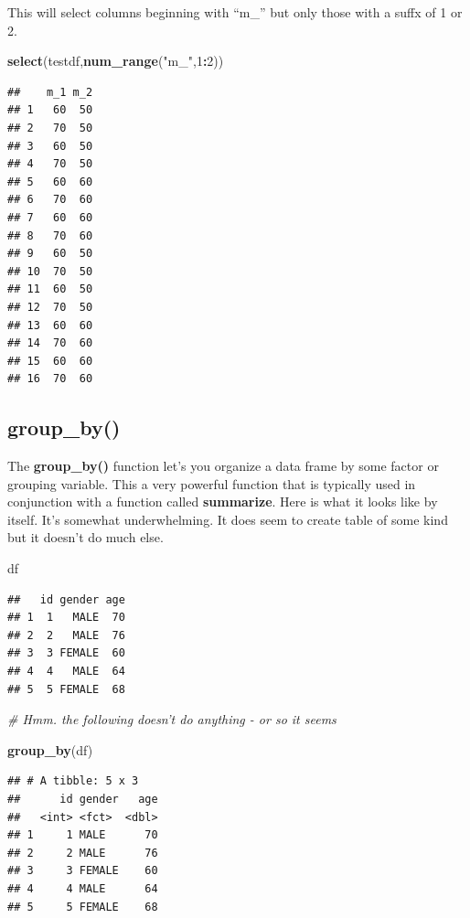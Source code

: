 \documentclass[]{book}
\newenvironment{Shaded}{\begin{snugshade}}{\end{snugshade}}
\newcommand{\CommentTok}[1]{\textcolor[rgb]{0.56,0.35,0.01}{\textit{#1}}}
\newcommand{\DecValTok}[1]{\textcolor[rgb]{0.00,0.00,0.81}{#1}}
\newcommand{\KeywordTok}[1]{\textcolor[rgb]{0.13,0.29,0.53}{\textbf{#1}}}
\newcommand{\NormalTok}[1]{#1}
\newcommand{\OperatorTok}[1]{\textcolor[rgb]{0.81,0.36,0.00}{\textbf{#1}}}
\newcommand{\StringTok}[1]{\textcolor[rgb]{0.31,0.60,0.02}{#1}}
\begin{document}
This will select columns beginning with ``m\_'' but only those with a suffx of 1 or 2.

\begin{Shaded}
\begin{Highlighting}[]
\KeywordTok{select}\NormalTok{(testdf,}\KeywordTok{num_range}\NormalTok{(}\StringTok{"m_"}\NormalTok{,}\DecValTok{1}\OperatorTok{:}\DecValTok{2}\NormalTok{))}
\end{Highlighting}
\end{Shaded}

\begin{verbatim}
##    m_1 m_2
## 1   60  50
## 2   70  50
## 3   60  50
## 4   70  50
## 5   60  60
## 6   70  60
## 7   60  60
## 8   70  60
## 9   60  50
## 10  70  50
## 11  60  50
## 12  70  50
## 13  60  60
## 14  70  60
## 15  60  60
## 16  70  60
\end{verbatim}

\hypertarget{group_by}{%
\subsection{group\_by()}\label{group_by}}

The \textbf{group\_by()} function let's you organize a data frame by some factor or grouping variable. This a very powerful function that is typically used in conjunction with a function called \textbf{summarize}. Here is what it looks like by itself. It's somewhat underwhelming. It does seem to create table of some kind but it doesn't do much else.

\begin{Shaded}
\begin{Highlighting}[]
\NormalTok{df}
\end{Highlighting}
\end{Shaded}

\begin{verbatim}
##   id gender age
## 1  1   MALE  70
## 2  2   MALE  76
## 3  3 FEMALE  60
## 4  4   MALE  64
## 5  5 FEMALE  68
\end{verbatim}

\begin{Shaded}
\begin{Highlighting}[]
\CommentTok{# Hmm. the following doesn't do anything - or so it seems}

\KeywordTok{group_by}\NormalTok{(df)}
\end{Highlighting}
\end{Shaded}

\begin{verbatim}
## # A tibble: 5 x 3
##      id gender   age
##   <int> <fct>  <dbl>
## 1     1 MALE      70
## 2     2 MALE      76
## 3     3 FEMALE    60
## 4     4 MALE      64
## 5     5 FEMALE    68
\end{verbatim}
\end{document}
